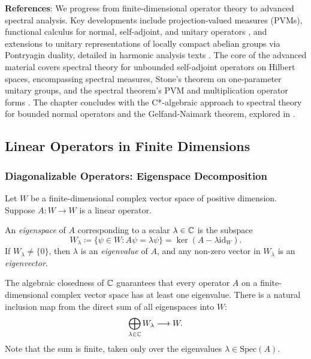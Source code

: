 \setcounter{tocdepth}{3}
\localtableofcontents

\textbf{References}: We progress from finite-dimensional operator theory \cite{HoffmanKunze1971}\cite{DummitFoote2004} to advanced spectral analysis. Key developments include projection-valued measures (PVMs), functional calculus for normal, self-adjoint, and unitary operators \cite{Conway1990}\cite{Hall2013Quantum}\cite{ReedSimon1980}, and extensions to unitary representations of locally compact abelian groups via Pontryagin duality, detailed in harmonic analysis texts \cite{Folland1995HarmonicAnalysis}\cite{Rudin1962FourierGroups}. The core of the advanced material covers spectral theory for unbounded self-adjoint operators on Hilbert spaces, encompassing spectral measures, Stone's theorem on one-parameter unitary groups, and the spectral theorem's PVM and multiplication operator forms \cite{ReedSimon1980}\cite{Rudin1991}\cite{Kato1995Perturbation}. The chapter concludes with the C*-algebraic approach to spectral theory for bounded normal operators and the Gelfand-Naimark theorem, explored in \cite{Murphy1990}\cite{Davidson1996}.

\subsection{Linear Operators in Finite Dimensions}

\subsubsection{Diagonalizable Operators: Eigenspace Decomposition}
\label{subsec:diagonalizable}

Let $W$ be a finite-dimensional complex vector space of positive dimension. Suppose $A: W \to W$ is a linear operator.

\begin{definition}
An \textit{eigenspace} of $A$ corresponding to a scalar $\lambda \in \mathbb{C}$ is the subspace
\[
W_{\lambda} \coloneqq \{ \psi \in W : A\psi = \lambda\psi \} = \ker(A - \lambda \text{id}_W).
\]
If $W_\lambda \neq \{0\}$, then $\lambda$ is an \textit{eigenvalue} of $A$, and any non-zero vector in $W_\lambda$ is an \textit{eigenvector}.
\end{definition}

The algebraic closedness of $\mathbb{C}$ guarantees that every operator $A$ on a finite-dimensional complex vector space has at least one eigenvalue. There is a natural inclusion map from the direct sum of all eigenspaces into $W$:
\begin{equation} \label{eq:4.2}
\bigoplus_{\lambda \in \mathbb{C}} W_{\lambda} \longrightarrow W.
\end{equation}
Note that the sum is finite, taken only over the eigenvalues $\lambda \in \text{Spec}(A)$.

